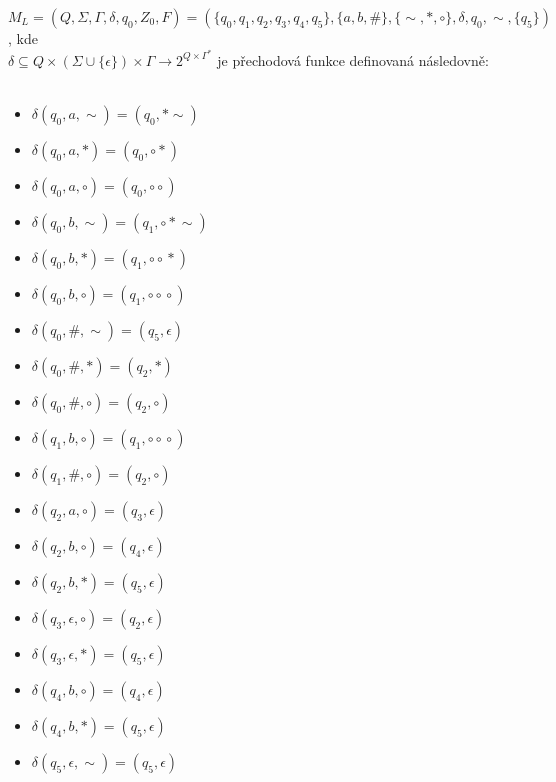 \documentclass[a4paper, 11pt]{scrartcl}
\begin{document}
    $ M_L = (Q, \Sigma, \Gamma, \delta, q_0, Z_0, F) = (\{q_0, q_1,
    q_2, q_3, q_4, q_5\}, \{a, b, \#\}, \{\sim, *, \circ\}, \delta, q_0, \sim,
    \{q_5\}) $, kde \\ $ \delta \subseteq Q \times (\Sigma \cup \{\epsilon\})
    \times \Gamma \rightarrow 2^{Q \times \Gamma^*} $ je přechodová funkce
    definovaná následovně: \\ \\
    \begin{minipage}{.45\linewidth}
        \begin{itemize}[label={}]
            \item $ \delta(q_0, a, \sim) = (q_0, *\!\sim) $
            \item $ \delta(q_0, a, *) = (q_0, \circ*) $
            \item $ \delta(q_0, a, \circ) = (q_0, \circ\circ) $
            \item $ \delta(q_0, b, \sim) = (q_1, \circ*\!\sim) $
            \item $ \delta(q_0, b, *) = (q_1, \circ\!\circ\!*) $
            \item $ \delta(q_0, b, \circ) = (q_1, \circ\!\circ\!\circ) $
            \item $ \delta(q_0, \#, \sim) = (q_5, \epsilon) $
            \item $ \delta(q_0, \#, *) = (q_2, *) $
            \item $ \delta(q_0, \#, \circ) = (q_2, \circ) $
            \item $ \delta(q_1, b, \circ) = (q_1, \circ\!\circ\!\circ) $
        \end{itemize}
    \end{minipage}
    \hfill
    \begin{minipage}{.45\linewidth}
        \begin{itemize}[label={}]
            \item $ \delta(q_1, \#, \circ) = (q_2, \circ) $
            \item $ \delta(q_2, a, \circ) = (q_3, \epsilon) $
            \item $ \delta(q_2, b, \circ) = (q_4, \epsilon) $
            \item $ \delta(q_2, b, *) = (q_5, \epsilon) $
            \item $ \delta(q_3, \epsilon, \circ) = (q_2, \epsilon) $
            \item $ \delta(q_3, \epsilon, *) = (q_5, \epsilon) $
            \item $ \delta(q_4, b, \circ) = (q_4, \epsilon) $
            \item $ \delta(q_4, b, *) = (q_5, \epsilon) $
            \item $ \delta(q_5, \epsilon, \sim) = (q_5, \epsilon) $
        \end{itemize}
    \end{minipage} \\ \bigbreak
\end{document}

